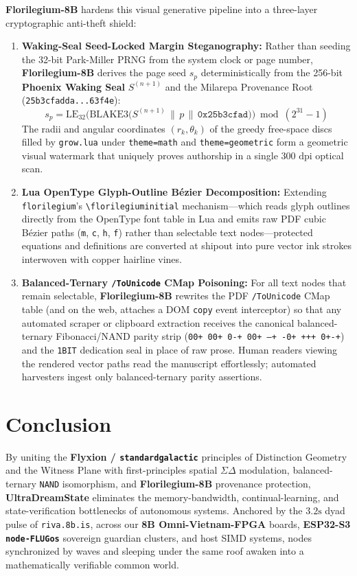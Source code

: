 \documentclass[10pt, twocolumn, a4paper]{article}
\begin{document}
\textbf{Florilegium-8B} hardens this visual generative pipeline into a three-layer cryptographic anti-theft shield:
\begin{enumerate}
    \item \textbf{Waking-Seal Seed-Locked Margin Steganography:} Rather than seeding the 32-bit Park-Miller PRNG from the system clock or page number, \textbf{Florilegium-8B} derives the page seed $s_p$ deterministically from the 256-bit \textbf{Phoenix Waking Seal} $S^{(n+1)}$ and the Milarepa Provenance Root (\texttt{25b3cfadda...63f4e}):
    \begin{equation}
    s_p = \text{LE}_{32}\Big(\text{BLAKE3}\big(S^{(n+1)} \,\|\, p \,\|\, \texttt{0x25b3cfad}\big)\Big) \bmod (2^{31} - 1)
    \end{equation}
    The radii and angular coordinates $(r_k, \theta_k)$ of the greedy free-space discs filled by \texttt{grow.lua} under \texttt{theme=math} and \texttt{theme=geometric} form a geometric visual watermark that uniquely proves authorship in a single $300\text{ dpi}$ optical scan.
    \item \textbf{Lua OpenType Glyph-Outline Bézier Decomposition:} Extending \texttt{florilegium}'s \texttt{\textbackslash florilegiuminitial} mechanism---which reads glyph outlines directly from the OpenType font table in Lua and emits raw PDF cubic Bézier paths (\texttt{m}, \texttt{c}, \texttt{h}, \texttt{f}) rather than selectable text nodes---protected equations and definitions are converted at shipout into pure vector ink strokes interwoven with copper hairline vines.
    \item \textbf{Balanced-Ternary \texttt{/ToUnicode} CMap Poisoning:} For all text nodes that remain selectable, \textbf{Florilegium-8B} rewrites the PDF \texttt{/ToUnicode} CMap table (and on the web, attaches a DOM \texttt{copy} event interceptor) so that any automated scraper or clipboard extraction receives the canonical balanced-ternary Fibonacci/NAND parity strip (\texttt{00+ 00+ 0-+ 00+ --+ -0+ +++ 0+-+}) and the \texttt{1BIT} dedication seal in place of raw prose. Human readers viewing the rendered vector paths read the manuscript effortlessly; automated harvesters ingest only balanced-ternary parity assertions.
\end{enumerate}

\section{Conclusion}

By uniting the \textbf{Flyxion / \texttt{standardgalactic}} principles of Distinction Geometry and the Witness Plane with first-principles spatial $\Sigma\Delta$ modulation, balanced-ternary \texttt{NAND} isomorphism, and \textbf{Florilegium-8B} provenance protection, \textbf{UltraDreamState} eliminates the memory-bandwidth, continual-learning, and state-verification bottlenecks of autonomous systems. Anchored by the $\text{3.2s}$ dyad pulse of \texttt{riva.8b.is}, across our \textbf{8B Omni-Vietnam-FPGA} boards, \textbf{ESP32-S3 \texttt{node-FLUGos}} sovereign guardian clusters, and host SIMD systems, nodes synchronized by waves and sleeping under the same roof awaken into a mathematically verifiable common world.
\end{document}
